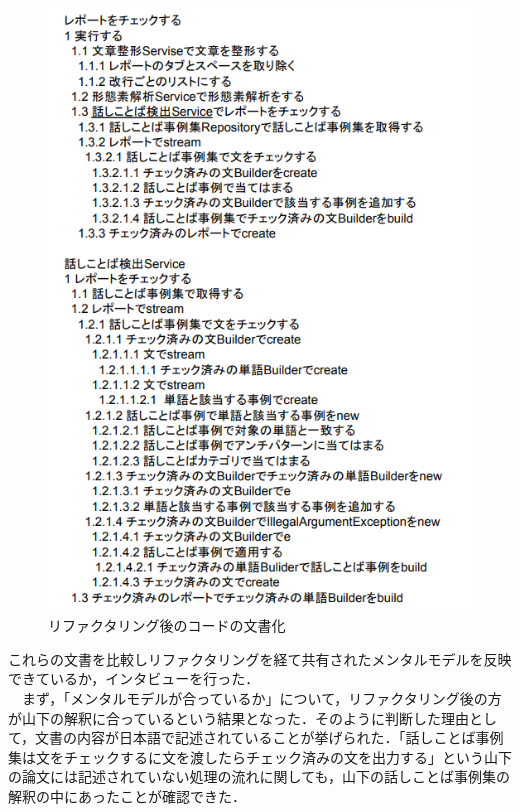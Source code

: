 \documentclass[12pt, a4paper]{jreport}
\begin{document}
\begin{figure}[H]
\centering
\includegraphics[width=1\linewidth]{image/modelAf.png}
\caption{リファクタリング後のコードの文書化}
\label{fig:enter-label}
\end{figure}
これらの文書を比較しリファクタリングを経て共有されたメンタルモデルを反映できているか，インタビューを行った．
\\　まず，「メンタルモデルが合っているか」について，リファクタリング後の方が山下の解釈に合っているという結果となった．そのように判断した理由として，文書の内容が日本語で記述されていることが挙げられた．「話しことば事例集は文をチェックするに文を渡したらチェック済みの文を出力する」という山下の論文には記述されていない処理の流れに関しても，山下の話しことば事例集の解釈の中にあったことが確認できた．
\end{document}
